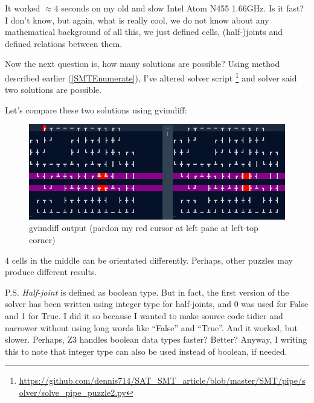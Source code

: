 It worked $\approx 4$ seconds on my old and slow Intel Atom N455 1.66GHz.
Is it fast? I don't know, but again, what is really cool, we do not know about any mathematical background
of all this, we just defined cells, (half-)joints and defined relations between them.

Now the next question is, how many solutions are possible?
Using method described earlier (\ref{SMTEnumerate}), I've altered solver script
\footnote{\url{https://github.com/dennis714/SAT_SMT_article/blob/master/SMT/pipe/solver/solve_pipe_puzzle2.py}} and solver
said two solutions are possible.

Let's compare these two solutions using gvimdiff:

\begin{figure}[H]
\centering
\includegraphics[scale=0.75]{SMT/pipe/solver/diff.png}
\caption{gvimdiff output (pardon my red cursor at left pane at left-top corner)}
\end{figure}

4 cells in the middle can be orientated differently.
Perhaps, other puzzles may produce different results.

P.S.
\textit{Half-joint} is defined as boolean type.
But in fact, the first version of the solver has been written using integer type for half-joints,
and 0 was used for False and 1 for True.
I did it so because I wanted to make source code tidier and narrower without using long words like ``False'' and ``True''.
And it worked, but slower. Perhaps, Z3 handles boolean data types faster? Better?
Anyway, I writing this to note that integer type can also be used instead of boolean, if needed.

